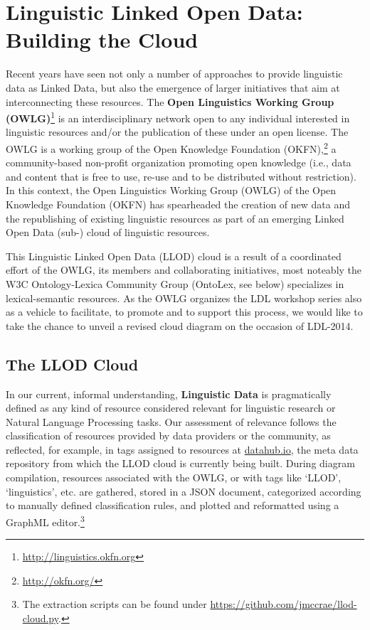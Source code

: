 \section{Linguistic Linked Open Data: Building the Cloud}

Recent years have seen not only a number of approaches to provide linguistic data as Linked Data, but also the emergence of larger initiatives that aim at interconnecting these resources.
The \textbf{Open Linguistics Working Group (OWLG)}\footnote{\url{http://linguistics.okfn.org}} is an interdisciplinary network open to any individual interested in linguistic resources and/or the publication of these under an open license. The OWLG is a working group of the Open Knowledge Foundation (OKFN),\footnote{\url{http://okfn.org/}} a community-based non-profit organization promoting open knowledge (i.e., data and content that is free to use, re-use and to be distributed without restriction).
In this context, the Open Linguistics Working Group (OWLG) of the Open Knowledge Foundation (OKFN) has spearheaded the creation of 
new data and the republishing of existing linguistic resources as part of an emerging Linked Open Data (sub-) cloud of linguistic resources. 

This Linguistic Linked Open Data (LLOD) cloud is a result of a coordinated effort of the OWLG, its members and collaborating initiatives, most noteably the W3C Ontology-Lexica Community Group (OntoLex, see below) specializes in lexical-semantic resources.
As the OWLG organizes the LDL workshop series also as a vehicle to facilitate, to promote and to support this process, we would like to take the chance to unveil a revised cloud diagram on the occasion of LDL-2014.

\subsection{The LLOD Cloud}

In our current, informal understanding, \textbf{Linguistic Data} is pragmatically defined as any kind of resource considered relevant for linguistic research or Natural Language Processing tasks. 
Our assessment of relevance follows the classification of resources provided by data providers or the community, as reflected, for example, in tags assigned to resources at \url{datahub.io}, the meta data repository from which the LLOD cloud is currently being built. During diagram compilation, resources associated with the OWLG, or with tags like `LLOD', `linguistics', etc. are gathered, stored in a JSON document, categorized according to manually defined classification rules, and plotted and reformatted using a GraphML editor.\footnote{
	The extraction scripts can be found under \url{https://github.com/jmccrae/llod-cloud.py}.
}

